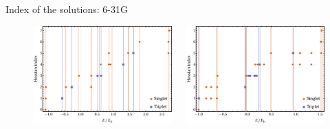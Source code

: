 \documentclass[10pt]{beamer}
\begin{document}
\begin{frame}{Index of the solutions:  6-31G}

  \begin{figure}
    \begin{columns}
      
      \pause[1]
      \begin{column}{0.48\textwidth}
        \includegraphics[width=\textwidth]{Figures/fig_2a.pdf}
      \end{column}

      \pause[2]
      \begin{column}{0.48\textwidth}
        \includegraphics[width=\textwidth]{Figures/fig_2b.pdf}
      \end{column}
      
    \end{columns}

  \end{figure}
  
\end{frame}
\end{document}
